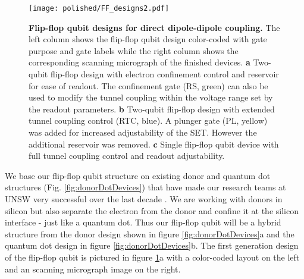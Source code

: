 \begin{figure}
	\centering
	\texttt{[image: polished/FF\_designs2.pdf]}
	\caption[Flip-flop qubit designs for direct dipole-dipole coupling]{\textbf{Flip-flop qubit designs for direct dipole-dipole coupling. } The left column shows the flip-flop qubit design color-coded with gate purpose and gate labels while the right column shows the corresponding scanning micrograph of the finished devices. \textbf{a} Two-qubit flip-flop design with electron confinement control and reservoir for ease of readout. The confinement gate (RS, green) can also be used to modify the tunnel coupling within the voltage range set by the readout parameters. \textbf{b} Two-qubit flip-flop design with extended tunnel coupling control (RTC, blue). A plunger gate (PL, yellow) was added for increased adjustability of the SET. However the additional reservoir was removed. \textbf{c} Single flip-flop qubit device with full tunnel coupling control and readout adjustability.}
	\label{fig:designFF}
\end{figure}

We base our flip-flop qubit structure on existing donor and quantum dot structures (Fig.  \ref{fig:donorDotDevices}) that have made our research teams at UNSW very successful over the last decade \cite{Muhonen2014, Veldhorst2014}. We are working with donors in silicon but also separate the electron from the donor and confine it at the silicon interface - just like a quantum dot. Thus our flip-flop qubit will be a hybrid structure from the donor design shown in figure \ref{fig:donorDotDevices}a and the quantum dot design in figure \ref{fig:donorDotDevices}b. The first generation design of the flip-flop qubit is pictured in figure \ref{fig:designFF}a with a color-coded  layout on the left and an scanning micrograph image on the right. 

